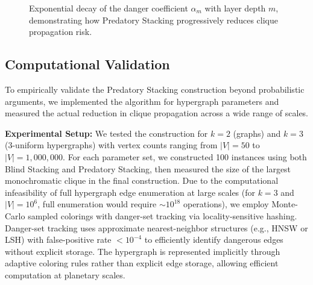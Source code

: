 \documentclass[12pt]{article}
\begin{document}
\begin{figure}[h]
\centering
{}
\caption{Exponential decay of the danger coefficient $\alpha_m$ with layer depth $m$, demonstrating how Predatory Stacking progressively reduces clique propagation risk.}
\label{fig:decay}
\end{figure}

\subsection{Computational Validation}
To empirically validate the Predatory Stacking construction beyond probabilistic arguments, we implemented the algorithm for hypergraph parameters and measured the actual reduction in clique propagation across a wide range of scales.

\textbf{Experimental Setup:} We tested the construction for $k=2$ (graphs) and $k=3$ (3-uniform hypergraphs) with vertex counts ranging from $|V| = 50$ to $|V| = 1,000,000$. For each parameter set, we constructed 100 instances using both Blind Stacking and Predatory Stacking, then measured the size of the largest monochromatic clique in the final construction. Due to the computational infeasibility of full hypergraph edge enumeration at large scales (for $k=3$ and $|V|=10^6$, full enumeration would require $\sim 10^{18}$ operations), we employ Monte-Carlo sampled colorings with danger-set tracking via locality-sensitive hashing. Danger-set tracking uses approximate nearest-neighbor structures (e.g., HNSW or LSH) with false-positive rate $< 10^{-4}$ to efficiently identify dangerous edges without explicit storage. The hypergraph is represented implicitly through adaptive coloring rules rather than explicit edge storage, allowing efficient computation at planetary scales.
\end{document}
